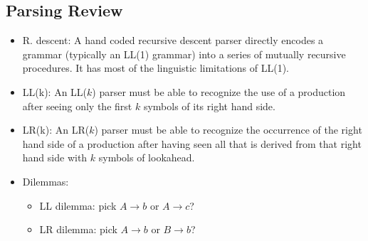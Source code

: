 \documentclass[10pt]{article}
\begin{document}
\subsection*{Parsing Review}
\begin{itemize}
    \item R. descent: A hand coded recursive descent parser directly encodes a grammar (typically an LL(1) grammar) into a series of mutually recursive procedures.  It has most of the linguistic limitations of LL(1).
    \item LL(k): An LL($k$) parser must be able to recognize the use of a production after seeing only the first $k$ symbols of its right hand side.
    \item LR(k): An LR($k$) parser must be able to recognize the occurrence of the right hand side of a production after having seen all that is derived from that right hand side with $k$ symbols of lookahead.
    \item Dilemmas:
    \begin{itemize}
        \item LL dilemma: pick $A \rightarrow b$ or $A \rightarrow c$?
        \item LR dilemma: pick $A \rightarrow b$ or $B \rightarrow b$?
    \end{itemize}
\end{itemize}
\end{document}
